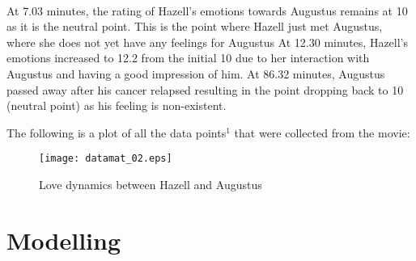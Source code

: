 \documentclass{article}
\newcommand*\circled[1]{\tikz[baseline=(char.base)]{
            \node[shape=circle,draw,inner sep=2pt] (char) {#1};}}
\begin{document}
\begin{par} 
\noindent\newline
\noindent
\\
At 7.03 minutes, the rating of Hazell's emotions towards Augustus remains at 10 as it is the neutral point. This is the point where Hazell just met Augustus,  where she does not yet have any feelings for Augustus
\noindent
At 12.30 minutes, Hazell's emotions increased to 12.2 from the initial 10 due to her interaction with Augustus and having a good impression of him. 
\noindent
At 86.32 minutes, Augustus passed away after his cancer relapsed resulting in the point dropping back to 10 (neutral point) as his feeling is non-existent. 
\end{par}
\newline
{\par \noindent
The following is a plot of all the data points\hyperlink{AppendixA}{$^1$} that were collected from the movie:

}
\begin{figure}[H]
	\centering
	\texttt{[image: datamat\_02.eps]}
	\caption{Love dynamics between Hazell and Augustus}
	\label{fig:Dynamics}
\end{figure}

\section*{\circled{3} Modelling}
\end{document}
